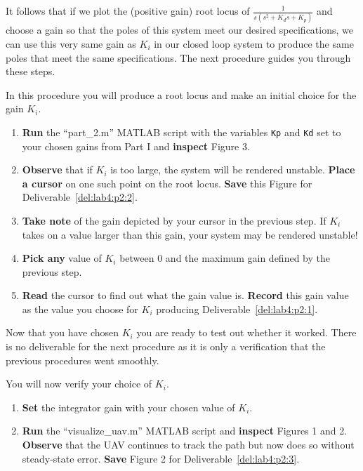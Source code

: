 It follows that if we plot the (positive gain) root locus of \(\frac{1}{s(s^2 + K_d s + K_p)}\) and choose a gain so that the poles of this system meet our desired specifications, we can use this very same gain as \(K_i\) in our closed loop system to produce the same poles that meet the same specifications.
The next procedure guides you through these steps.
%
\begin{procedure}[label={proc:lab4:ki}]
  In this procedure you will produce a root locus and make an initial choice for the gain \(K_i.\)
  \begin{enumerate}[label={(\arabic*)}]
    \item{%
      \textbf{Run} the ``part\_2.m'' MATLAB script with the variables \texttt{Kp} and \texttt{Kd} set to your chosen gains from Part I and \textbf{inspect} Figure 3.
    }
    \item{%
      \textbf{Observe} that if \(K_i\) is too large, the system will be rendered unstable. \textbf{Place a cursor} on one such point on the root locus.
      \textbf{Save} this Figure for Deliverable~\ref{del:lab4:p2:2}.
    }
    \item{%
      \textbf{Take note} of the gain depicted by your cursor in the previous step.
      If \(K_i\) takes on a value larger than this gain, your system may be rendered unstable!
    }
    \item{%
      \textbf{Pick any} value of \(K_i\) between \(0\) and the maximum gain defined by the previous step.
    }
    \item{%
      \textbf{Read} the cursor to find out what the gain value is.
      \textbf{Record} this gain value as the value you choose for \(K_i\) producing Deliverable~\ref{del:lab4:p2:1}.
    }
  \end{enumerate}
\end{procedure}
%
Now that you have chosen \(K_i\) you are ready to test out whether it worked.
There is no deliverable for the next procedure as it is only a verification that the previous procedures went smoothly.
%
\begin{procedure}[label={proc:lab4:verify}]
  You will now verify your choice of \(K_i.\)
  \begin{enumerate}[label={(\arabic*)}]
    \item{%
      \textbf{Set} the integrator gain with your chosen value of \(K_i.\)
    }
    \item{%
      \textbf{Run} the ``visualize\_uav.m'' MATLAB script and \textbf{inspect} Figures 1 and 2.
      \textbf{Observe} that the UAV continues to track the path but now does so without steady-state error.
      \textbf{Save} Figure 2 for Deliverable~\ref{del:lab4:p2:3}.
    }
  \end{enumerate}
\end{procedure}

